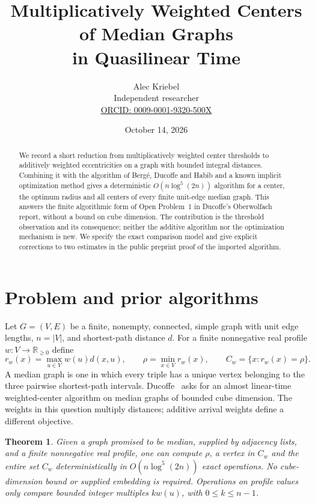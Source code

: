 \documentclass[11pt]{article}
\title{Multiplicatively Weighted Centers of Median Graphs\\
in Quasilinear Time}
\author{Alec Kriebel\\\small Independent researcher\\
\small\href{https://orcid.org/0009-0001-9320-500X}{ORCID: 0009-0001-9320-500X}}
\date{October 14, 2026}
\newtheorem{theorem}{Theorem}
\newcommand{\R}{\mathbb R}
\begin{document}
\maketitle
\begin{abstract}
We record a short reduction from multiplicatively weighted center thresholds
to additively weighted eccentricities on a graph with bounded integral
distances. Combining it with the algorithm of Berg\'e, Ducoffe and Habib
and a known implicit optimization method gives a deterministic
$O(n\log^5(2n))$ algorithm for a center, the optimum radius and all centers
of every finite unit-edge median graph. This answers the finite algorithmic
form of Open Problem~1 in Ducoffe's Oberwolfach report, without a bound on
cube dimension. The contribution is the threshold observation and its
consequence; neither the additive algorithm nor the optimization mechanism
is new. We specify the exact comparison model and give explicit corrections
to two estimates in the public preprint proof of the imported algorithm.
\end{abstract}

\section{Problem and prior algorithms}
Let $G=(V,E)$ be a finite, nonempty, connected, simple graph with unit edge
lengths, $n=|V|$, and shortest-path distance $d$. For a finite nonnegative
real profile $w:V\to\R_{\geq0}$ define
\[
 r_w(x)=\max_{u\in V}w(u)d(x,u),\qquad
 \rho=\min_{x\in V}r_w(x),\qquad C_w=\{x:r_w(x)=\rho\}.
\]
A median graph is one in which every triple has a unique vertex belonging
to the three pairwise shortest-path intervals. Ducoffe~\cite[pp.~504--505]{OWR}
asks for an almost linear-time weighted-center algorithm on median graphs
of bounded cube dimension. The weights in this question multiply
distances; additive arrival weights define a different objective.

\begin{theorem}\label{thm:main}
Given a graph promised to be median, supplied by adjacency lists, and a
finite nonnegative real profile, one can compute $\rho$, a vertex in $C_w$
and the entire set $C_w$ deterministically in $O(n\log^5(2n))$ exact
operations. No cube-dimension bound or supplied embedding is required.
Operations on profile values only compare bounded integer multiples
$k w(u)$, with $0\leq k\leq n-1$.
\end{theorem}
\end{document}

